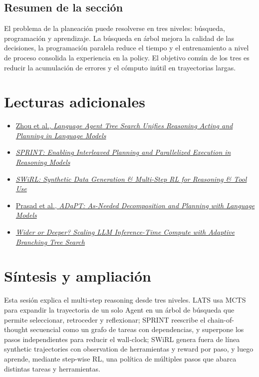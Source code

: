 \documentclass[a4paper]{article}
\begin{document}
\subsection{Resumen de la sección}

El problema de la planeación puede resolverse en tres niveles: búsqueda, programación y aprendizaje. La búsqueda en árbol mejora la calidad de las decisiones, la programación paralela reduce el tiempo y el entrenamiento a nivel de proceso consolida la experiencia en la policy. El objetivo común de los tres es reducir la acumulación de errores y el cómputo inútil en trayectorias largas.
\section{Lecturas adicionales}

\begin{itemize}
    \item \href{https://arxiv.org/abs/2310.04406}{Zhou et al., \emph{Language Agent Tree Search Unifies Reasoning Acting and Planning in Language Models}}
    \item \href{https://arxiv.org/abs/2506.05745}{\emph{SPRINT: Enabling Interleaved Planning and Parallelized Execution in Reasoning Models}}
    \item \href{https://arxiv.org/abs/2504.04736}{\emph{SWiRL: Synthetic Data Generation \& Multi-Step RL for Reasoning \& Tool Use}}
    \item \href{https://arxiv.org/abs/2311.05772}{Prasad et al., \emph{ADaPT: As-Needed Decomposition and Planning with Language Models}}
    \item \href{https://arxiv.org/abs/2503.04412}{\emph{Wider or Deeper? Scaling LLM Inference-Time Compute with Adaptive Branching Tree Search}}
\end{itemize}

\section{Síntesis y ampliación}

Esta sesión explica el multi-step reasoning desde tres niveles. LATS usa MCTS para expandir la trayectoria de un solo Agent en un árbol de búsqueda que permite seleccionar, retroceder y reflexionar; SPRINT reescribe el chain-of-thought secuencial como un grafo de tareas con dependencias, y superpone los pasos independientes para reducir el wall-clock; SWiRL genera fuera de línea synthetic trajectories con observation de herramientas y reward por paso, y luego aprende, mediante step-wise RL, una política de múltiples pasos que abarca distintas tareas y herramientas.
\end{document}

